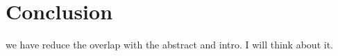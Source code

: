 \documentclass[11pt, letterpaper, twoside]{article}
\begin{document}
\section{Conclusion}

we have reduce the overlap with the abstract and intro. I will think about it.

%
%

\clearpage
\end{document}
